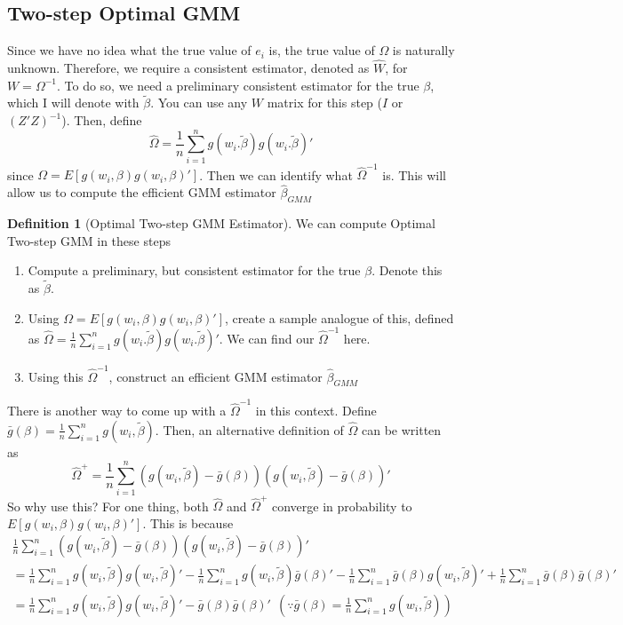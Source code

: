 \documentclass[12pt]{article}
\theoremstyle{definition}
\newtheorem{definition}{Definition}[section]
\theoremstyle{property}
\theoremstyle{assumption}
\theoremstyle{example}
\theoremstyle{comment}
\begin{document}
\subsection{Two-step Optimal GMM}
Since we have no idea what the true value of $e_i$ is, the true value of $\Omega$ is naturally unknown. Therefore, we require a consistent estimator, denoted as $\widehat{W}$, for $W=\Omega^{-1}$. To do so, we need a preliminary consistent estimator for the true $\beta$, which I will denote with $\tilde{\beta}$. You can use any $W$ matrix for this step ($I$ or $(Z'Z)^{-1}$). Then, define
\[
\widehat{\Omega}=\frac{1}{n}\sum_{i=1}^n g(w_i.\tilde{\beta})g(w_i.\tilde{\beta})'
\]
since $\Omega = E[g(w_i,\beta)g(w_i,\beta)']$. Then we can identify what $\widehat{\Omega}^{-1}$ is. This will allow us to compute the efficient GMM estimator $\hat{\beta}_{GMM}$
\begin{mdframed}[backgroundcolor=blue!5] 
\begin{definition}[Optimal Two-step GMM Estimator] We can compute Optimal Two-step GMM in these steps
\begin{enumerate}
\item Compute a preliminary, but consistent estimator for the true $\beta$. Denote this as $\tilde{\beta}$. 
\item Using $\Omega=E[g(w_i,\beta)g(w_i,\beta)']$, create a sample analogue of this, defined as $\widehat{\Omega}=\frac{1}{n}\sum_{i=1}^n g(w_i.\tilde{\beta})g(w_i.\tilde{\beta})'$. We can find our $\widehat{\Omega}^{-1}$ here. 
\item Using this $\widehat{\Omega}^{-1}$, construct an efficient GMM estimator $\hat{\beta}_{GMM}$
\end{enumerate}
\end{definition}
\end{mdframed}\par
There is another way to come up with a $\widehat{\Omega}^{-1}$ in this context. Define $\bar{g}(\beta)=\frac{1}{n}\sum_{i=1}^ng(w_i,\tilde{\beta})$. Then, an alternative definition of $\widehat{\Omega}$ can be written as
\[
\widehat{\Omega}^+=\frac{1}{n}\sum_{i=1}^n(g(w_i,\tilde{\beta})-\bar{g}(\beta))(g(w_i,\tilde{\beta})-\bar{g}(\beta))'
\]
So why use this? For one thing, both $\widehat{\Omega}$ and $\widehat{\Omega}^+$ converge in probability to $E[g(w_i,\beta)g(w_i,\beta)']$. This is because
\begin{gather*}
\frac{1}{n}\sum_{i=1}^n(g(w_i,\tilde{\beta})-\bar{g}(\beta))(g(w_i,\tilde{\beta})-\bar{g}(\beta))'\\
=\frac{1}{n}\sum_{i=1}^ng(w_i,\tilde{\beta})g(w_i,\tilde{\beta})'-\frac{1}{n}\sum_{i=1}^ng(w_i,\tilde{\beta})\bar{g}(\beta)'-\frac{1}{n}\sum_{i=1}^n\bar{g}(\beta)g(w_i,\tilde{\beta})'+\frac{1}{n}\sum_{i=1}^n \bar{g}(\beta)\bar{g}(\beta)'\\
=\frac{1}{n}\sum_{i=1}^ng(w_i,\tilde{\beta})g(w_i,\tilde{\beta})'- \bar{g}(\beta)\bar{g}(\beta)' \ \ \left(\because \bar{g}(\beta)=\frac{1}{n}\sum_{i=1}^ng(w_i,\tilde{\beta})\right)\\
\end{gather*}
\end{document}
